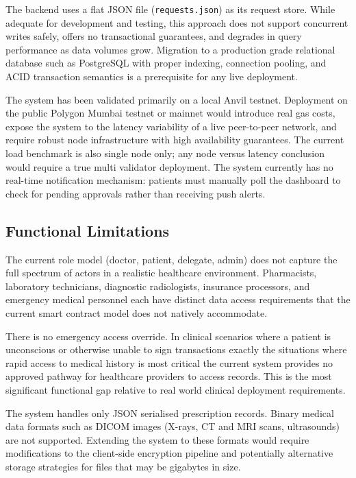 \documentclass[12pt,a4wide]{report}
\begin{document}
The backend uses a flat JSON file (\texttt{requests.json}) as its request store.
While adequate for development and testing, this approach does not support
concurrent writes safely, offers no transactional guarantees, and degrades in
query performance as data volumes grow. Migration to a production grade relational
database such as PostgreSQL with proper indexing, connection pooling, and ACID
transaction semantics is a prerequisite for any live deployment.

The system has been validated primarily on a local Anvil testnet. Deployment on
the public Polygon Mumbai testnet or mainnet would introduce real gas costs, expose
the system to the latency variability of a live peer-to-peer network, and require
robust node infrastructure with high availability guarantees. The current load
benchmark is also single node only; any node versus latency conclusion would
require a true multi validator deployment. The system currently has no real-time
notification mechanism: patients must manually poll the dashboard to check for
pending approvals rather than receiving push alerts.

\subsection{Functional Limitations}

The current role model (doctor, patient, delegate, admin) does not capture the
full spectrum of actors in a realistic healthcare environment. Pharmacists,
laboratory technicians, diagnostic radiologists, insurance processors, and
emergency medical personnel each have distinct data access requirements that the
current smart contract model does not natively accommodate.

There is no emergency access override. In clinical scenarios where a patient is
unconscious or otherwise unable to sign transactions exactly the situations
where rapid access to medical history is most critical the current system
provides no approved pathway for healthcare providers to access records. This is
the most significant functional gap relative to real world clinical deployment
requirements.

The system handles only JSON serialised prescription records. Binary medical data
formats such as DICOM images (X-rays, CT and MRI scans, ultrasounds) are not
supported. Extending the system to these formats would require modifications to
the client-side encryption pipeline and potentially alternative storage strategies
for files that may be gigabytes in size.
\end{document}
